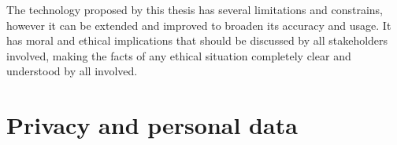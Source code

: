 The technology proposed by this thesis has several limitations and constrains, however it can be extended and improved to broaden its accuracy and usage. It has moral and ethical implications that should be discussed by all stakeholders involved, making the facts of any ethical situation completely clear and understood by all involved.

\section{Privacy and personal data}


